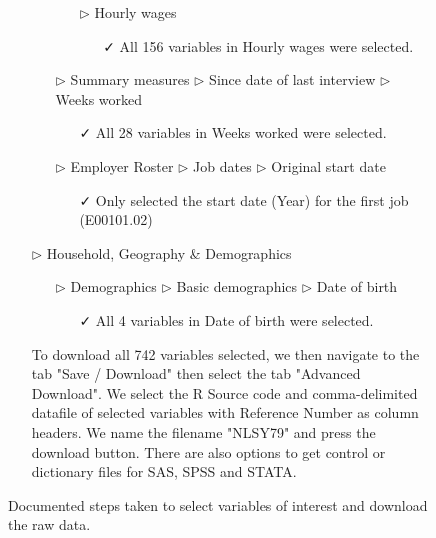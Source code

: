 \documentclass[12pt]{article}
\begin{document}
\begin{figure}[t]
\begin{tcolorbox}[title = Navigating the data source]
\begin{itemize}
\begin{itemize}
\begin{itemize}
\begin{itemize}
\end{itemize}
\item[$\triangleright$] Hourly wages
\begin{itemize}
\item[\faCheck] All 156 variables in Hourly wages were selected.
\end{itemize}
\end{itemize}
\end{itemize}
\begin{itemize}
\item[$\triangleright$] Summary measures $\triangleright$ Since date of last interview $\triangleright$ Weeks worked
\begin{itemize}
\item[\faCheck] All 28 variables in Weeks worked were selected.
\end{itemize}
\end{itemize}
\begin{itemize}
\item[$\triangleright$] Employer Roster $\triangleright$ Job dates $\triangleright$ Original start date
\begin{itemize}
\item[\faCheck] Only selected the start date (Year) for the first job (E00101.02)
\end{itemize}
\end{itemize}
\item[$\triangleright$] Household, Geography \& Demographics
\begin{itemize}
\item[$\triangleright$] Demographics $\triangleright$ Basic demographics $\triangleright$ Date of birth
\begin{itemize}
\item[\faCheck] All 4 variables in Date of birth were selected. 
\end{itemize}
\end{itemize}
\end{itemize}
\begin{itemize}
\item[\faCloudDownload] To download all 742 variables selected, we then navigate to the tab "Save / Download" then select the tab "Advanced Download". We select the R Source code and comma-delimited datafile of selected variables with Reference Number as column headers. We name the filename "NLSY79" and press the download button. There are also options to get control or dictionary files for SAS, SPSS and STATA. 
\end{itemize}
\end{tcolorbox}
\caption{Documented steps taken to select variables of interest and download the raw data.\label{fig:source-nav}}
\end{figure}
\end{document}
